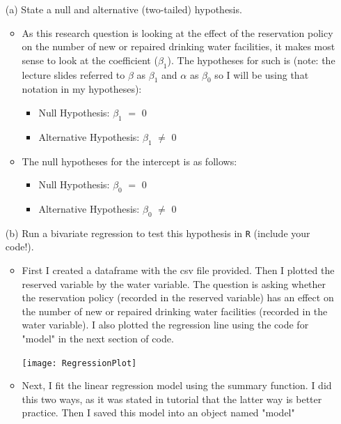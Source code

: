 \documentclass[12pt,letterpaper]{article}
\begin{document}
\newpage
\begin{enumerate}
	\item [(a)] State a null and alternative (two-tailed) hypothesis. 
	
		\begin{itemize}
			\item As this research question is looking at the effect of the reservation policy on the number of new or repaired drinking water facilities, it makes most sense to look at the coefficient ($\beta_1$). The hypotheses for such is (note: the lecture slides referred to $\beta$ as $\beta_1$ and $\alpha$ as $\beta_0$ so I will be using that notation in my hypotheses):
				\begin{itemize}
					\item {Null Hypothesis: $\beta_1$ $=$ 0}
					\item {Alternative Hypothesis: $\beta_1$ $\neq$ 0}
				\end{itemize}
			\item The null hypotheses for the intercept is as follows:
				\begin{itemize}
					\item {Null Hypothesis: $\beta_0$ $=$ 0}
					\item {Alternative Hypothesis: $\beta_0$ $\neq$ 0}
				\end{itemize}
		\end{itemize}
	
	\vspace{0cm}
	\item [(b)] Run a bivariate regression to test this hypothesis in \texttt{R} (include your code!).
			
		\begin{itemize}
			\item First I created a dataframe with the csv file provided. Then I plotted the reserved variable by the water variable. The question is asking whether the reservation policy (recorded in the reserved variable) has an effect on the number of new or repaired drinking water facilities (recorded in the water variable). I also plotted the regression line using the code for "model" in the next section of code.
				
				
				\texttt{[image: RegressionPlot]}\hfill
			\item Next, I fit the linear regression model using the summary function. I did this two ways, as it was stated in tutorial that the latter way is better practice. Then I saved this model into an object named "model"
				
				
				
		\end{itemize}
			

\end{enumerate}
\end{document}
